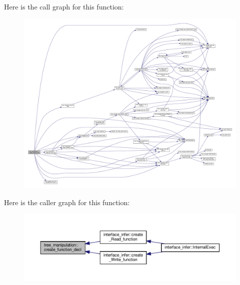 Here is the call graph for this function\+:
\nopagebreak
\begin{figure}[H]
\begin{center}
\leavevmode
\includegraphics[width=350pt]{d0/d99/classtree__manipulation_aa7404f53160cd6406f4d3b99f23fffab_cgraph}
\end{center}
\end{figure}
Here is the caller graph for this function\+:
\nopagebreak
\begin{figure}[H]
\begin{center}
\leavevmode
\includegraphics[width=350pt]{d0/d99/classtree__manipulation_aa7404f53160cd6406f4d3b99f23fffab_icgraph}
\end{center}
\end{figure}
\mbox{\label{classtree__manipulation_a4ae45d68f51af7c5bb7a4f15d025f33e}} 
